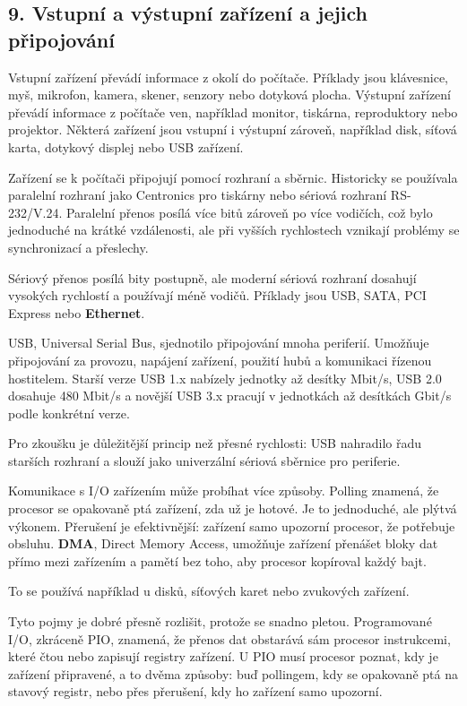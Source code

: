 \subsection*{9. Vstupní a výstupní zařízení a jejich připojování}

Vstupní zařízení převádí informace z okolí do počítače. Příklady jsou klávesnice, myš, mikrofon, kamera, skener, senzory nebo dotyková plocha. Výstupní zařízení převádí informace z počítače ven, například monitor, tiskárna, reproduktory nebo projektor. Některá zařízení jsou vstupní i výstupní zároveň, například disk, síťová karta, dotykový displej nebo USB zařízení.

Zařízení se k počítači připojují pomocí rozhraní a sběrnic. Historicky se používala paralelní rozhraní jako Centronics pro tiskárny nebo sériová rozhraní RS-232/V.24. Paralelní přenos posílá více bitů zároveň po více vodičích, což bylo jednoduché na krátké vzdálenosti, ale při vyšších rychlostech vznikají problémy se synchronizací a přeslechy.

Sériový přenos posílá bity postupně, ale moderní sériová rozhraní dosahují vysokých rychlostí a používají méně vodičů. Příklady jsou USB, SATA, PCI Express nebo \textbf{Ethernet}.

USB, Universal Serial Bus, sjednotilo připojování mnoha periferií. Umožňuje připojování za provozu, napájení zařízení, použití hubů a komunikaci řízenou hostitelem. Starší verze USB 1.x nabízely jednotky až desítky Mbit/s, USB 2.0 dosahuje 480 Mbit/s a novější USB 3.x pracují v jednotkách až desítkách Gbit/s podle konkrétní verze.

Pro zkoušku je důležitější princip než přesné rychlosti: USB nahradilo řadu starších rozhraní a slouží jako univerzální sériová sběrnice pro periferie.

Komunikace s I/O zařízením může probíhat více způsoby. Polling znamená, že procesor se opakovaně ptá zařízení, zda už je hotové. Je to jednoduché, ale plýtvá výkonem. Přerušení je efektivnější: zařízení samo upozorní procesor, že potřebuje obsluhu. \textbf{DMA}, Direct Memory Access, umožňuje zařízení přenášet bloky dat přímo mezi zařízením a pamětí bez toho, aby procesor kopíroval každý bajt.

To se používá například u disků, síťových karet nebo zvukových zařízení.

Tyto pojmy je dobré přesně rozlišit, protože se snadno pletou. Programované I/O, zkráceně PIO, znamená, že přenos dat obstarává sám procesor instrukcemi, které čtou nebo zapisují registry zařízení. U PIO musí procesor poznat, kdy je zařízení připravené, a to dvěma způsoby: buď pollingem, kdy se opakovaně ptá na stavový registr, nebo přes přerušení, kdy ho zařízení samo upozorní.

